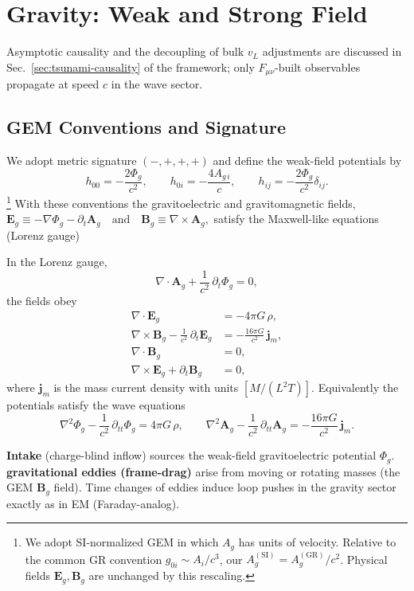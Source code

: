 \section{Gravity: Weak and Strong Field}
Asymptotic causality and the decoupling of bulk $v_L$ adjustments are discussed in Sec.~\ref{sec:tsunami-causality} of the framework; only $F_{\mu\nu}$-built observables propagate at speed $c$ in the wave sector.


\subsection*{GEM Conventions and Signature}
We adopt metric signature $(-,+,+,+)$ and define the weak-field potentials by
\begin{equation}
h_{00} = -\frac{2\Phi_g}{c^2},\qquad
h_{0i} = -\frac{4 A_{g\,i}}{c},\qquad
h_{ij} = -\frac{2\Phi_g}{c^2}\delta_{ij}.
\end{equation}
\footnote{We adopt SI-normalized GEM in which $A_g$ has units of velocity. Relative to the common GR convention $g_{0i} \sim A_i/c^3$, our $A_g^{\mathrm{(SI)}} = A_g^{\mathrm{(GR)}}/c^2$. Physical fields $\mathbf{E}_g, \mathbf{B}_g$ are unchanged by this rescaling.}
With these conventions the gravitoelectric and gravitomagnetic fields,
$\mathbf{E}_g \equiv -\nabla \Phi_g - \partial_t \mathbf{A}_g \quad\text{and}\quad
\mathbf{B}_g \equiv \nabla \times \mathbf{A}_g,$
satisfy the Maxwell-like equations (Lorenz gauge)

In the Lorenz gauge,
\[
\nabla\!\cdot\!\mathbf{A}_g + \frac{1}{c^2}\,\partial_t \Phi_g = 0,
\]
the fields obey
\[
\begin{aligned}
\nabla\!\cdot\!\mathbf{E}_g &= -4\pi G\,\rho,\\
\nabla\!\times\!\mathbf{B}_g - \frac{1}{c^2}\,\partial_t \mathbf{E}_g &= -\frac{16\pi G}{c^2}\,\mathbf{j}_m,\\
\nabla\!\cdot\!\mathbf{B}_g &= 0,\\
\nabla\!\times\!\mathbf{E}_g + \partial_t \mathbf{B}_g &= 0,
\end{aligned}
\]
where $\mathbf{j}_m$ is the mass current density with units $[M/(L^2T)]$. Equivalently the potentials satisfy the wave equations
\[
\nabla^2 \Phi_g - \frac{1}{c^2}\,\partial_{tt} \Phi_g = 4\pi G\,\rho,\qquad
\nabla^2 \mathbf{A}_g - \frac{1}{c^2}\,\partial_{tt} \mathbf{A}_g = -\frac{16\pi G}{c^2}\,\mathbf{j}_m.
\]

\begin{tcolorbox}[title=Terminology bridge (gravity side)]
\textbf{Intake} (charge-blind inflow) sources the weak-field gravitoelectric potential $\Phi_g$.
\textbf{gravitational eddies (frame-drag)} arise from moving or rotating masses (the GEM $\mathbf B_g$ field).
Time changes of eddies induce loop pushes in the gravity sector exactly as in EM (Faraday-analog).
\end{tcolorbox}

